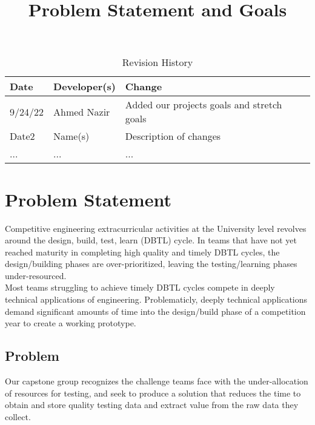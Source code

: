 \documentclass{article}
\title{Problem Statement and Goals\\\progname}
\author{\authname}
\date{}
\begin{document}
\maketitle

\begin{table}[hp]
\caption{Revision History} \label{TblRevisionHistory}
\begin{tabularx}{\textwidth}{llX}
\toprule
\textbf{Date} & \textbf{Developer(s)} & \textbf{Change}\\
\midrule
9/24/22 & Ahmed Nazir & Added our projects goals and stretch goals\\
Date2 & Name(s) & Description of changes\\
... & ... & ...\\
\bottomrule
\end{tabularx}
\end{table}

\section{Problem Statement}


Competitive engineering extracurricular activities at the University level revolves around the design, build, test, learn (DBTL) cycle. In teams that have not yet reached maturity in completing high quality and timely DBTL cycles, the design/building phases are over-prioritized, leaving the testing/learning phases under-resourced.     \\

Most teams struggling to achieve timely DBTL cycles compete in deeply technical applications of engineering. Problematicly, deeply technical applications demand significant amounts of time into the design/build phase of a competition year to create a working prototype. \newpage

\subsection{Problem}

Our capstone group recognizes the challenge teams face with the under-allocation of resources for testing, and seek to produce a solution that reduces the time to obtain and store quality testing data and extract value from the raw data they collect. \\ 
\end{document}
